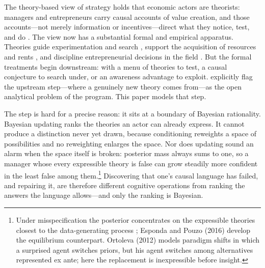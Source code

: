 \documentclass[11pt]{article}
\theoremstyle{definition}
\begin{document}
The theory-based view of strategy holds that economic actors are theorists: managers and entrepreneurs carry causal accounts of value creation, and those accounts---not merely information or incentives---direct what they notice, test, and do \citep{FelinZenger2017,FelinGambardellaZenger2024}.
The view now has a substantial formal and empirical apparatus.
Theories guide experimentation and search \citep{CamuffoEtAl2020,ChavdaGansStern2024}, support the acquisition of resources and rents \citep{EhrigZenger2024}, and discipline entrepreneurial decisions in the field \citep{CamuffoEtAl2024,OttHannah2024}.
But the formal treatments begin downstream: with a menu of theories to test, a causal conjecture to search under, or an awareness advantage to exploit.
\citet{FelinGambardellaZenger2024} explicitly flag the upstream step---where a genuinely new theory comes from---as the open analytical problem of the program.
This paper models that step.

The step is hard for a precise reason: it sits at a boundary of Bayesian rationality.
Bayesian updating ranks the theories an actor can already express.
It cannot produce a distinction never yet drawn, because conditioning reweights a space of possibilities and no reweighting enlarges the space.
Nor does updating sound an alarm when the space itself is broken: posterior mass always sums to one, so a manager whose every expressible theory is false can grow steadily more confident in the least false among them.\footnote{%
Under misspecification the posterior concentrates on the expressible theories closest to the data-generating process \citep{Berk1966}; Esponda and Pouzo (2016) develop the equilibrium counterpart.
Ortoleva (2012) models paradigm shifts in which a surprised agent switches priors, but his agent switches among alternatives represented ex ante; here the replacement is inexpressible before insight.
}
Discovering that one's causal language has failed, and repairing it, are therefore different cognitive operations from ranking the answers the language allows---and only the ranking is Bayesian.
\end{document}
